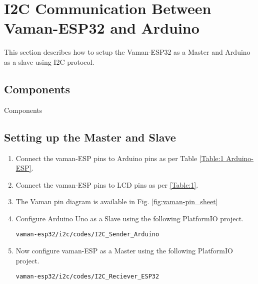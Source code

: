 \section{I2C Communication Between Vaman-ESP32 and Arduino}
This section describes how to setup the Vaman-ESP32 as a Master and Arduino as a
slave using I2C protocol.
\subsection{Components}

\begin{table}[!ht]
\centering

\caption{Components}
\label{table:i2c-components}
\end{table}

\subsection{Setting up the Master and Slave}
\begin{enumerate}[label=\thesection.\arabic*.,ref=\thesection.\theenumi]

\item
Connect the vaman-ESP pins to Arduino pins as per Table \ref{Table:1 Arduino-ESP}.
\begin{table}[!ht]
\centering

\caption{}
\label{Table:1 Arduino-ESP}
\end{table}

\item Connect the vaman-ESP pins to LCD pins as per \ref{Table:1}.

\item The Vaman pin diagram is available in Fig. \ref{fig:vaman-pin_sheet}

\item
Configure Arduino Uno as a Slave using the following PlatformIO project.
\begin{lstlisting}
vaman-esp32/i2c/codes/I2C_Sender_Arduino
\end{lstlisting}
\item
Now configure vaman-ESP as a Master using the following PlatformIO project.
\begin{lstlisting}
vaman-esp32/i2c/codes/I2C_Reciever_ESP32
\end{lstlisting}

\end{enumerate}